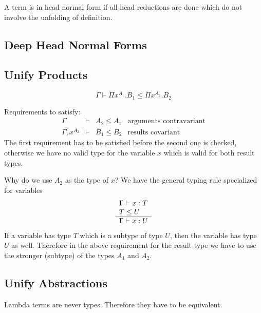 A term is in head normal form if all head reductions are done which do not
involve the unfolding of definition.





\subsection{Deep Head Normal Forms}






\subsection{Unify Products}

$$
    \Gamma \vdash \Pi x^{A_1}. B_1 \le \Pi x^{A_2}. B_2
$$

Requirements to satisfy:
$$
\begin{array}{llll}
    \Gamma &\vdash&
    A_2 \le A_1
    &\text{arguments contravariant}
    \\
    \Gamma, x^{A_2} &\vdash&
    B_1 \le B_2
    &\text{results covariant}
\end{array}
$$
The first requirement has to be satisfied before the second one is checked,
otherwise we have no valid type for the variable $x$ which is valid for both
result types.

Why do we use $A_2$ as the type of $x$? We have the general typing rule
specialized for variables
$$
    \begin{array}{l} 
        \Gamma \vdash x : T
        \\
        T \le U
     \\ \hline 
        \Gamma \vdash x: U
     \end{array}
$$
If a variable has type $T$ which is a subtype of type $U$, then the variable has
type $U$ as well. Therefore in the above requirement for the result type we have
to use the stronger (subtype) of the types $A_1$ and $A_2$.






\subsection{Unify Abstractions}

Lambda terms are never types. Therefore they have to be equivalent.


